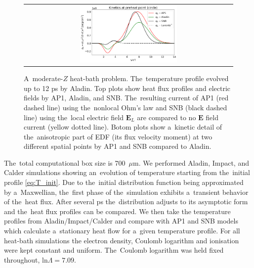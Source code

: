 \documentclass[
 aps,
 jmp,
 amsmath,amssymb,
 twocolumn,
]{revtex4-1}
\newcommand{\figscale}{0.48}
\newcommand{\vect}[1]{\boldsymbol{#1}}
\newcommand{\Zbar}{Z}
\newcommand{\E}{\vect{E}}
\newcommand{\lnc}{\text{ln}\Lambda}
\begin{document}
\begin{figure}[htb]
\begin{center}
\begin{tabular}{c}
      \includegraphics[width=\figscale\textwidth]{C7_Aladin_case3_nonlocal_kinetics.png}  
    \end{tabular}
  \caption{  
  A~moderate-$\Zbar$ heat-bath problem. The~temperature profile evolved 
  up to 12 ps by Aladin.
  Top plots show heat flux profiles and electric fields by AP1, Aladin, 
  and SNB. The~resulting current of AP1 (red dashed line) using 
  the~nonlocal Ohm's law and SNB (black dashed line) using 
  the~local electric field $\E_L$ are compared to no $\E$ field current 
  (yellow dotted line). 
  Botom plots show a~kinetic detail of
  the~anisotropic part of EDF (its flux velocity moment) at two different 
  spatial points by AP1 and SNB compared to Aladin. 
  }
  \label{fig:C7_Aladin_case3}
  \end{center} 
\end{figure}

The~total computational box size is 700~$\mu$m.
We performed Aladin, Impact, and Calder simulations showing an~evolution of
temperature starting from the~initial profile \eqref{eq:T_init}. 
Due to the~initial distribution function being approximated by a~Maxwellian,
the~first phase of the~simulation exhibits a~transient behavior of the~heat
flux. After several ps the~distribution adjusts to its asymptotic form
and the~heat flux profiles can be compared. 
We then take the temperature profiles from Aladin/Impact/Calder and compare 
with AP1 and SNB models which calculate a~stationary heat flow
for a~given temperature profile. 
For all heat-bath simulations the electron density, Coulomb logarithm and 
ionisation were kept constant and uniform.
The~Coulomb logarithm was held fixed throughout, $\lnc = 7.09$.
\end{document}
